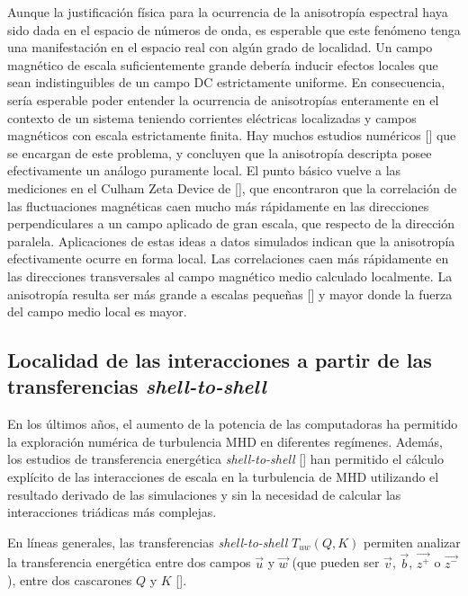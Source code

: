 Aunque la justificación física para la ocurrencia de la anisotropía
espectral haya sido dada en el espacio de números de onda, es
esperable que este fenómeno tenga una manifestación en el espacio real
con algún grado de localidad. Un campo magnético de escala
suficientemente grande debería inducir efectos locales que sean
indistinguibles de un campo DC estrictamente uniforme. En
consecuencia, sería esperable poder entender la ocurrencia de
anisotropías enteramente en el contexto de un sistema teniendo
corrientes eléctricas localizadas y campos magnéticos con escala
estrictamente finita. Hay muchos estudios numéricos
[\cite{cho_anisotropy_2000, milano_local_2001}] que se encargan de
este problema, y concluyen que la anisotropía descripta posee
efectivamente un análogo puramente local. El punto básico vuelve a las
mediciones en el Culham Zeta Device de
[\cite{robinson_structure_1971}], que encontraron que la correlación
de las fluctuaciones magnéticas caen mucho más rápidamente en las
direcciones perpendiculares a un campo aplicado de gran escala, que
respecto de la dirección paralela. Aplicaciones de estas ideas a datos
simulados indican que la anisotropía efectivamente ocurre en forma
local. Las correlaciones caen más rápidamente en las direcciones
transversales al campo magnético medio calculado localmente. La
anisotropía resulta ser más grande a escalas pequeñas
[\cite{cho_anisotropy_2000}] y mayor donde la fuerza del campo medio
local es mayor.

\subsection{Localidad de las interacciones a partir de las transferencias \emph{shell-to-shell}}
En los últimos años, el aumento de la potencia de las computadoras ha
permitido la exploración numérica de turbulencia MHD en diferentes
regímenes. Además, los estudios de transferencia energética
\textit{shell-to-shell} [\cite{alexakis_shell_2005, dar_energy_2001,
  debliquy_energy_2005}] han permitido el cálculo explícito de las
interacciones de escala en la turbulencia de MHD utilizando el
resultado derivado de las simulaciones y sin la necesidad de calcular
las interacciones triádicas más complejas.

En líneas generales, las transferencias \textit{shell-to-shell}
$T_{uw}(Q, K)$ permiten analizar la transferencia energética
entre dos campos $\vec{u}$ y $\vec{w}$ (que pueden ser $\vec{v}$,
$\vec{b}$, $\vec{z^+}$ o $\vec{z^-}$), entre dos cascarones $Q$ y $K$
[\cite{mininni_scale_2011}].

